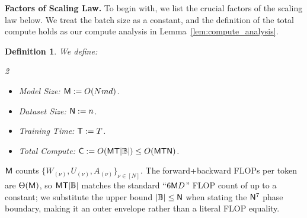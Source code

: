 \documentclass[11pt]{article}
\let\citet\citep
\theoremstyle{plain}
\newtheorem{definition}[theorem]{Definition}
\begin{document}
{\bf Factors of Scaling Law.} To begin with, we list the crucial factors of the scaling law below. We treat the batch size as a constant, and the definition of the total compute holds as our compute analysis in Lemma~\ref{lem:compute_analysis}.
\begin{definition}\label{def:factors}
    We define:
    \begin{multicols}{2}
    \begin{itemize}
        \item Model Size: ${\sf M} := O(Nmd)$.
        \item Dataset Size: ${\sf N} := n$.
        \item Training Time: ${\sf T} := T$.
        \item Total Compute: ${\sf C} := O({\sf MT}|\mathbb{B}|) \le O({\sf MTN})$.
    \end{itemize}
    \end{multicols}
\end{definition}
\noindent ${\sf M}$ counts $\{W_{(\nu)}, U_{(\nu)}, A_{(\nu)}\}_{\nu\in[N]}$. The forward+backward FLOPs per token are $\Theta({\sf M})$, so ${\sf MT}|\mathbb{B}|$ matches the standard ``$6{\sf M}D$'' FLOP count of \citet{kmh+20, hbm+22} up to a constant; we substitute the upper bound $|\mathbb{B}|\le{\sf N}$ when stating the ${\sf N}^7$ phase boundary, making it an outer envelope rather than a literal FLOP equality.
\end{document}
